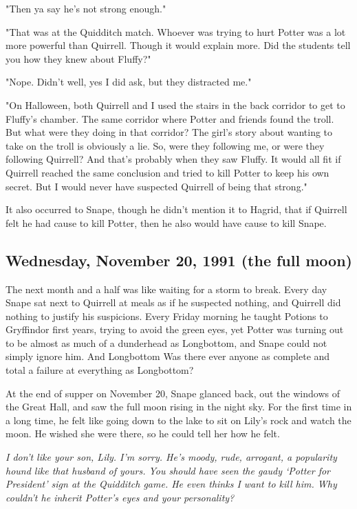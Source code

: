 "Then ya say he's not strong enough."

"That was at the Quidditch match. Whoever was trying to hurt Potter was a lot more powerful than Quirrell. Though it would explain more. Did the students tell you how they knew about Fluffy?"

"Nope. Didn't{\el} well, yes I did ask, but they distracted me."

"On Halloween, both Quirrell and I used the stairs in the back corridor to get to Fluffy's chamber. The same corridor where Potter and friends found the troll. But what were they doing in that corridor? The girl's story about wanting to take on the troll is obviously a lie. So, were they following me, or were they following Quirrell? And that's probably when they saw Fluffy. It would all fit if Quirrell reached the same conclusion and tried to kill Potter to keep his own secret. But I would never have suspected Quirrell of being that strong."

It also occurred to Snape, though he didn't mention it to Hagrid, that if Quirrell felt he had cause to kill Potter, then he also would have cause to kill Snape.

\subsection{Wednesday, November 20, 1991 (the full moon)}

The next month and a half was like waiting for a storm to break. Every day Snape sat next to Quirrell at meals as if he suspected nothing, and Quirrell did nothing to justify his suspicions. Every Friday morning he taught Potions to Gryffindor first years, trying to avoid the green eyes, yet Potter was turning out to be almost as much of a dunderhead as Longbottom, and Snape could not simply ignore him. And Longbottom{\el} Was there ever anyone as complete and total a failure at everything as Longbottom?

At the end of supper on November 20, Snape glanced back, out the windows of the Great Hall, and saw the full moon rising in the night sky. For the first time in a long time, he felt like going down to the lake to sit on Lily's rock and watch the moon. He wished she were there, so he could tell her how he felt.

\emph{I don't like your son, Lily. I'm sorry. He's moody, rude, arrogant, a popularity hound like that husband of yours. You should have seen the gaudy `Potter for President' sign at the Quidditch game. He even thinks I want to kill him. Why couldn't he inherit Potter's eyes and your personality?}

